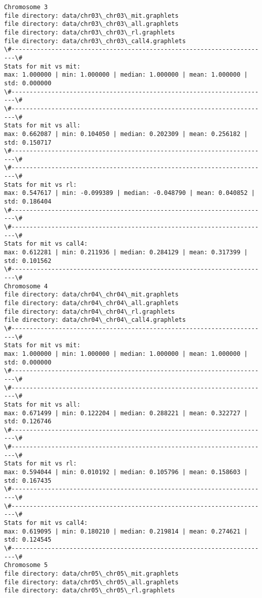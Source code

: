 \documentclass[11pt]{article}
\begin{document}
\begin{Verbatim}[commandchars=\\\{\}]
Chromosome 3
file directory: data/chr03\_chr03\_mit.graphlets
file directory: data/chr03\_chr03\_all.graphlets
file directory: data/chr03\_chr03\_rl.graphlets
file directory: data/chr03\_chr03\_call4.graphlets
\#-----------------------------------------------------------------------\#
Stats for mit vs mit: 
max: 1.000000 | min: 1.000000 | median: 1.000000 | mean: 1.000000 | std: 0.000000
\#-----------------------------------------------------------------------\#
\#-----------------------------------------------------------------------\#
Stats for mit vs all: 
max: 0.662087 | min: 0.104050 | median: 0.202309 | mean: 0.256182 | std: 0.150717
\#-----------------------------------------------------------------------\#
\#-----------------------------------------------------------------------\#
Stats for mit vs rl: 
max: 0.547617 | min: -0.099389 | median: -0.048790 | mean: 0.040852 | std: 0.186404
\#-----------------------------------------------------------------------\#
\#-----------------------------------------------------------------------\#
Stats for mit vs call4: 
max: 0.612281 | min: 0.211936 | median: 0.284129 | mean: 0.317399 | std: 0.101562
\#-----------------------------------------------------------------------\#
Chromosome 4
file directory: data/chr04\_chr04\_mit.graphlets
file directory: data/chr04\_chr04\_all.graphlets
file directory: data/chr04\_chr04\_rl.graphlets
file directory: data/chr04\_chr04\_call4.graphlets
\#-----------------------------------------------------------------------\#
Stats for mit vs mit: 
max: 1.000000 | min: 1.000000 | median: 1.000000 | mean: 1.000000 | std: 0.000000
\#-----------------------------------------------------------------------\#
\#-----------------------------------------------------------------------\#
Stats for mit vs all: 
max: 0.671499 | min: 0.122204 | median: 0.288221 | mean: 0.322727 | std: 0.126746
\#-----------------------------------------------------------------------\#
\#-----------------------------------------------------------------------\#
Stats for mit vs rl: 
max: 0.594044 | min: 0.010192 | median: 0.105796 | mean: 0.158603 | std: 0.167435
\#-----------------------------------------------------------------------\#
\#-----------------------------------------------------------------------\#
Stats for mit vs call4: 
max: 0.619095 | min: 0.180210 | median: 0.219814 | mean: 0.274621 | std: 0.124545
\#-----------------------------------------------------------------------\#
Chromosome 5
file directory: data/chr05\_chr05\_mit.graphlets
file directory: data/chr05\_chr05\_all.graphlets
file directory: data/chr05\_chr05\_rl.graphlets

\end{Verbatim}
\end{document}
